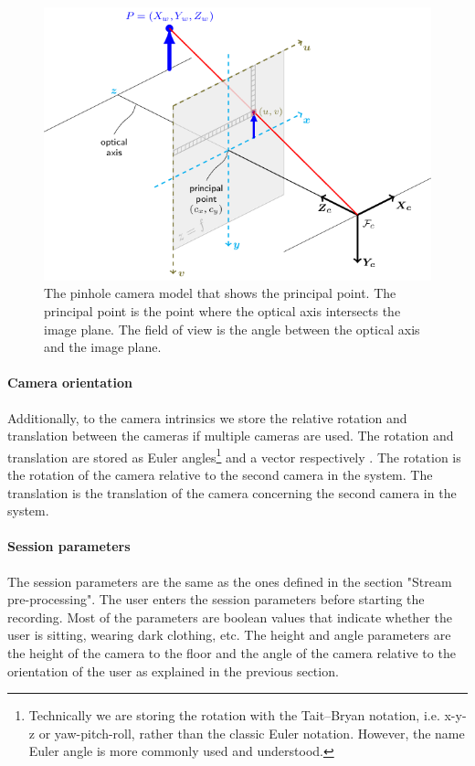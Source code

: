 \begin{figure}[ht]
  \centering
  \includegraphics[width=.9\textwidth]{figures/CameraCalibration/pinhole_camera_model.png}
  \caption[Pinhole camera model]{The pinhole camera model that shows the principal point. The principal point is the point where the optical axis intersects the image plane. The field of view is the angle between the optical axis and the image plane.}
  \label{fig:pinhole_camera_model}
\end{figure}

\paragraph{Camera orientation}

Additionally, to the camera intrinsics we store the relative rotation and translation between the cameras if multiple cameras are used. The rotation and translation are stored as Euler angles\footnote{Technically we are storing the rotation with the Tait–Bryan notation, i.e. x-y-z or yaw-pitch-roll, rather than the classic Euler notation. However, the name Euler angle is more commonly used and understood.} and a vector respectively \cite{euler1776formulae}. The rotation is the rotation of the camera relative to the second camera in the system. The translation is the translation of the camera concerning the second camera in the system.

\paragraph{Session parameters}

The session parameters are the same as the ones defined in the section "Stream pre-processing". The user enters the session parameters before starting the recording. Most of the parameters are boolean values that indicate whether the user is sitting, wearing dark clothing, etc. The height and angle parameters are the height of the camera to the floor and the angle of the camera relative to the orientation of the user as explained in the previous section.

